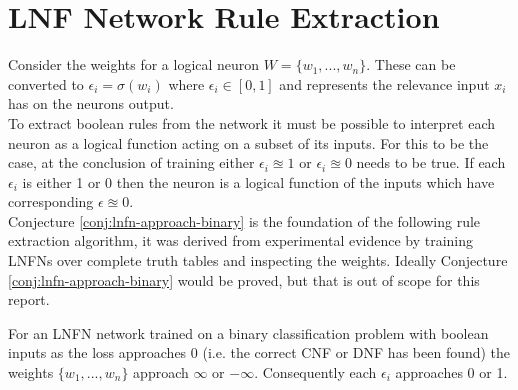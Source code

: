 \section{LNF Network Rule Extraction} \label{sec:lnfn-rule-extraction}
Consider the weights for a logical neuron $W = \{w_1, ..., w_n\}$. These can be converted to $\epsilon_i = \sigma(w_i)$ where $\epsilon_i \in [0, 1]$ and represents the relevance input $x_i$ has on the neurons output.\\

To extract boolean rules from the network it must be possible to interpret each neuron as a logical function acting on a subset of its inputs. For this to be the case, at the conclusion of training either $\epsilon_i \approxeq 1$ or $\epsilon_i \approxeq 0$ needs to be true. If each $\epsilon_i$ is either 1 or 0 then the neuron is a logical function of the inputs which have corresponding $\epsilon \approxeq 0$.\\

Conjecture \ref{conj:lnfn-approach-binary} is the foundation of the following rule extraction algorithm, it was derived from experimental evidence by training LNFNs over complete truth tables and inspecting the weights. Ideally Conjecture \ref{conj:lnfn-approach-binary} would be proved, but that is out of scope for this report.

\begin{conjecture}
	For an LNFN network trained on a binary classification problem with boolean inputs as the loss approaches 0  (i.e. the correct CNF or DNF has been found) the weights $\{ w_1, ..., w_n \}$ approach $\infty$ or $-\infty$. Consequently each $\epsilon_i$ approaches 0 or 1.
	\label{conj:lnfn-approach-binary}
\end{conjecture}

